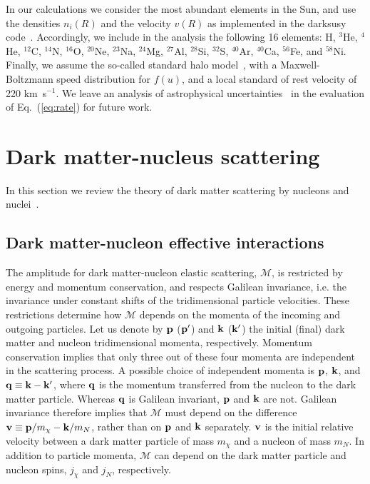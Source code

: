\documentclass[11pt,a4paper]{article}
\begin{document}
In our calculations we consider the most abundant elements in the Sun, and use the densities $n_i(R)$ and the velocity $v(R)$ as implemented in the {\sffamily darksusy} code~\cite{Gondolo:2004sc}. Accordingly, we include in the analysis the following 16 elements: H, $^{3}$He, $^{4}$He, $^{12}$C, $^{14}$N, $^{16}$O, $^{20}$Ne, $^{23}$Na, $^{24}$Mg, $^{27}$Al, $^{28}$Si, $^{32}$S, $^{40}$Ar, $^{40}$Ca, $^{56}$Fe, and $^{58}$Ni. Finally, we assume the so-called standard halo model~\cite{Freese:2012xd}, with a Maxwell-Boltzmann speed distribution for $f(u)$, and a local standard of rest velocity of 220 km~s$^{-1}$. We leave an analysis of astrophysical uncertainties~\cite{Bozorgnia:2013pua,Catena:2011kv,Catena:2009mf} in the evaluation of Eq.~(\ref{eq:rate}) for future work.

\section{Dark matter-nucleus scattering}
\label{sec:eft}
In this section we review the theory of dark matter scattering by nucleons and nuclei~\cite{Fitzpatrick:2012ix}.
\subsection{Dark matter-nucleon effective interactions}
\label{sec:dmnu}
The amplitude for dark matter-nucleon elastic scattering, $\mathcal{M}$, is restricted by energy and momentum conservation, and respects Galilean invariance, i.e. the invariance under constant shifts of the tridimensional particle velocities. These restrictions determine how $\mathcal{M}$ depends on the momenta of the incoming and outgoing particles. Let us denote by ${\bf p}$ (${\bf p'}$) and  ${\bf k}$ (${\bf k'}$) the initial (final) dark matter and nucleon tridimensional momenta, respectively. Momentum conservation implies that only three out of these four momenta are independent in the scattering process. A possible choice of independent momenta is ${\bf p}$, ${\bf k}$, and ${\bf q}\equiv {\bf k}-{\bf k'}$, where ${\bf q}$ is the momentum transferred from the nucleon to the dark matter particle.    
Whereas ${\bf q}$ is Galilean invariant, ${\bf p}$ and ${\bf k}$ are not. Galilean invariance therefore implies that $\mathcal{M}$ must depend on the difference ${\bf v}\equiv {\bf p}/m_\chi -  {\bf k}/m_N $, rather than on ${\bf p}$ and ${\bf k}$ separately. ${\bf v}$ is the initial relative velocity between a dark matter particle of mass $m_\chi$ and a nucleon of mass $m_N$. In addition to particle momenta, $\mathcal{M}$ can depend on the dark matter particle and nucleon spins, $j_\chi$ and $j_N$, respectively. 
\end{document}

